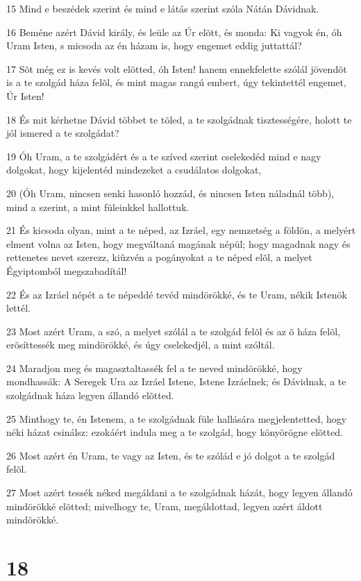 \par 15 Mind e beszédek szerint és mind e látás szerint szóla Nátán Dávidnak.
\par 16 Beméne azért Dávid király, és leüle az Úr elõtt, és monda: Ki vagyok én, óh Uram Isten, s micsoda az én házam is, hogy engemet eddig juttattál?
\par 17 Sõt még ez is kevés volt elõtted, óh Isten! hanem ennekfelette szólál jövendõt is a te szolgád háza felõl, és mint magas rangú embert, úgy tekintettél engemet, Úr Isten!
\par 18 És mit kérhetne Dávid többet te tõled, a te szolgádnak tisztességére, holott te jól ismered a te szolgádat?
\par 19 Óh Uram, a te szolgádért és a te szíved szerint cselekedéd mind e nagy dolgokat, hogy kijelentéd mindezeket a csudálatos dolgokat,
\par 20 (Óh Uram, nincsen senki hasonló hozzád, és nincsen Isten náladnál több), mind a szerint, a mint füleinkkel hallottuk.
\par 21 És kicsoda olyan, mint a te néped, az Izráel, egy nemzetség a földön, a melyért elment volna az Isten, hogy megváltaná magának népül; hogy magadnak nagy és rettenetes nevet szerezz, kiûzvén a pogányokat a te néped elõl, a melyet Égyiptomból megszabadítál!
\par 22 És az Izráel népét a te népeddé tevéd mindörökké, és te Uram, nékik Istenök lettél.
\par 23 Most azért Uram, a szó, a melyet szólál a te szolgád felõl és az õ háza felõl, erõsíttessék meg mindörökké, és úgy cselekedjél, a mint szóltál.
\par 24 Maradjon meg és magasztaltassék fel a te neved mindörökké, hogy mondhassák: A Seregek Ura az Izráel Istene, Istene Izráelnek; és Dávidnak, a te szolgádnak háza legyen állandó elõtted.
\par 25 Minthogy te, én Istenem, a te szolgádnak füle hallására megjelentetted, hogy néki házat csinálsz: ezokáért indula meg a te szolgád, hogy könyörögne elõtted.
\par 26 Most azért én Uram, te vagy az Isten, és te szólád e jó dolgot a te szolgád felõl.
\par 27 Most azért tessék néked megáldani a te szolgádnak házát, hogy legyen állandó mindörökké elõtted; mivelhogy te, Uram, megáldottad, legyen azért áldott mindörökké.

\chapter{18}

